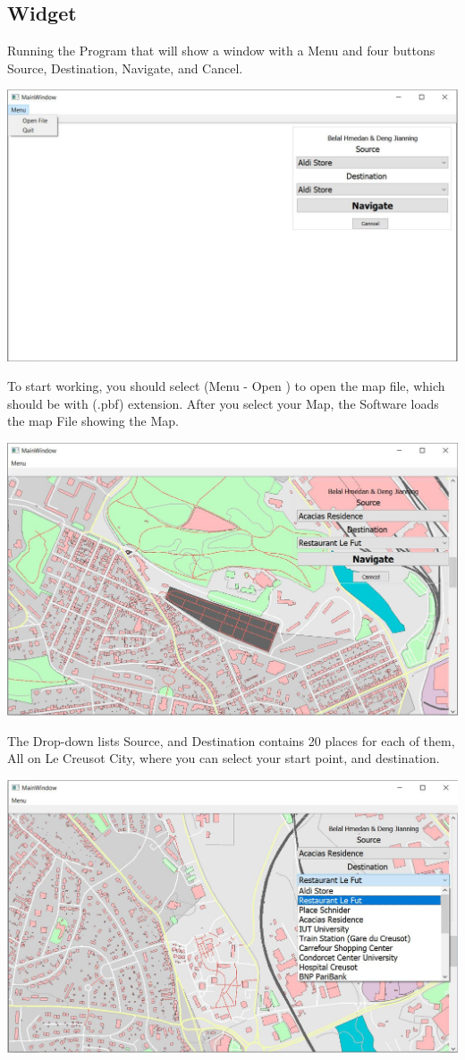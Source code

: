 \documentclass[a4paper, 12pt, english]{book}
\begin{document}
\subsection{Widget}
Running the Program that will show a window with a Menu and four buttons Source, Destination, Navigate, and Cancel.
\begin{center}
\includegraphics[width=.6\textwidth]{GUI_NoMap.JPG}
\end{center}
To start working, you should select (Menu - Open )
to open the map file, which should be with (.pbf) extension.
After you select your Map, the Software loads the map File showing the Map.
\begin{center}
\includegraphics[width=.6\textwidth]{GUI_Map0.JPG}
\end{center}
The Drop-down lists Source, and Destination contains 20 places for each of them, All on Le Creusot City, where you can select your start point, and destination.
\begin{center}
\includegraphics[width=.6\textwidth]{GUI_Map1.JPG}
\end{center}
\end{document}
